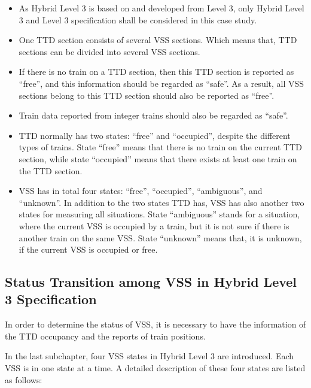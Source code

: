 \documentclass[article,dr=phil,type=msc,colorback,accentcolor=tud9c]{tudthesis}
\begin{document}
  \begin{itemize}
  	
  	\item 
  	As Hybrid Level 3 is based on and developed from Level 3, only Hybrid Level 3 and Level 3 specification shall be considered in this case study.
  	
  	\item
  	One TTD section consists of several VSS sections. Which means that, TTD sections can be divided into several VSS sections.
  	
  	\item
  	If there is no train on a TTD section, then this TTD section is reported as ``free'', and this information should be regarded as ``safe''. As a result, all VSS sections belong to this TTD section should also be reported as ``free''.
  	
  	\item
  	Train data reported from integer trains should also be regarded as ``safe''. 
  	
  	\item
  	TTD normally has two states: ``free'' and ``occupied'', despite the different types of trains. State ``free'' means that there is no train on the current TTD section, while state ``occupied'' means that there exists at least one train on the TTD section.
  	
  	\item 
  	VSS has in total four states: ``free'', ``occupied'', ``ambiguous'', and ``unknown''. In addition to the two states TTD has, VSS has also another two states for measuring all situations. State ``ambiguous'' stands for a situation, where the current VSS is occupied by a train, but it is not sure if there is another train on the same VSS. State ``unknown'' means that, it is unknown, if the current VSS is occupied or free. \cite{hoang2018hybrid}
  	
  \end{itemize}

  \subsection{Status Transition among VSS in Hybrid Level 3 Specification}

  In order to determine the status of VSS, it is necessary to have the information of the TTD occupancy and the reports of train positions.\cite{hybridl3}

  In the last subchapter, four VSS states in Hybrid Level 3 are introduced. Each VSS is in one state at a time. A detailed description of these four states are listed as follows:
\end{document}
